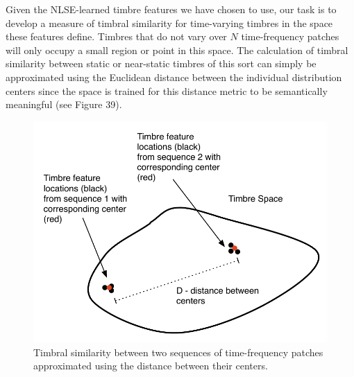 \documentclass[12pt]{report} 	%
\numberwithin{figure}{chapter}
\numberwithin{table}{chapter}
\numberwithin{equation}{chapter}
\begin{document}
\begin{flushleft}
Given the NLSE-learned timbre features we have chosen to use, our task is to develop a measure of timbral similarity for time-varying timbres in the space these features define. Timbres that do not vary over $N$ time-frequency patches will only occupy a small region or point in this space. The calculation of timbral similarity between static or near-static timbres of this sort can simply be approximated using the Euclidean distance between the individual distribution centers since the space is trained for this distance metric to be semantically meaningful (see Figure 39). 
\begin{figure}[h!]
\begin{center}
\includegraphics[scale=0.8]{TimbreDistance1}
\caption[Timbre distance between centers]{Timbral similarity between two sequences of time-frequency patches approximated using the distance between their centers.}
\end{center}
\end{figure}


\end{flushleft}
\end{document}
